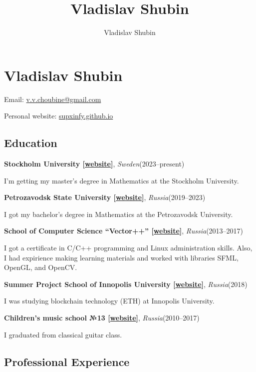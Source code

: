 \documentclass[11pt]{article}
\author{Vladislav Shubin}
\title{Vladislav Shubin}
\begin{document}
\section*{Vladislav Shubin}

\begin{center}
	Email: \href{mailto:v.v.choubine@gmail.com}{v.v.choubine@gmail.com}
	
	Personal website: \href{https://supxinfy.github.io}{supxinfy.github.io}
\end{center}

\subsection*{Education}

\textbf{Stockholm University [\href{https://www.su.se}{website}]}, \textit{Sweden}\hfill(2023--present)

I'm getting my master's degree in Mathematics at the Stockholm University.

\vspace{2mm}
\noindent\textbf{Petrozavodsk State University [\href{https://petrsu.ru}{website}]}, \textit{Russia}\hfill(2019--2023)


I got my bachelor's degree in Mathematics at the Petrozavodsk University.

\vspace{2mm}
\noindent\textbf{School of Computer Science ``Vector++'' [\href{https://www.vector-plus-plus.ru}{website}]}, \textit{Russia}\hfill(2013--2017)

I got a certificate in C/C++ programming and Linux administration skills. Also, I had expirience making learning materials and worked with libraries SFML, OpenGL, and OpenCV.

\vspace{2mm}
\noindent\textbf{Summer Project School of Innopolis University [\href{https://team-project.university.innopolis.ru/projectschool2018}{website}]}, \textit{Russia}\hfill(2018) 

I was studying blockchain technology (ETH) at Innopolis University. 

\vspace{2mm}
\noindent\textbf{Children's music school №13 [\href{http://dmsh13.org.ru}{website}]}, \textit{Russia}\hfill(2010--2017)

I graduated from classical guitar class. 
\subsection*{Professional Experience}
\end{document}
